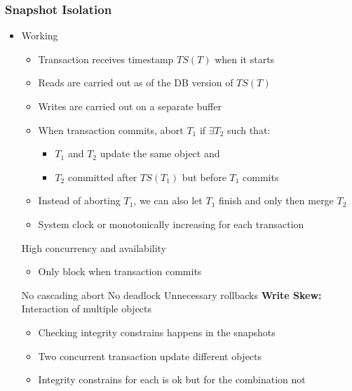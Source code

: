 \subsubsection{Snapshot Isolation}
\begin{itemize}
     Assume that transaction are serializable and revert if they are not
    \item Working
        \begin{itemize}
            \item Transaction receives timestamp $TS(T)$ when it starts
            \item Reads are carried out as of the DB version of $TS(T)$
            \item Writes are carried out on a separate buffer
            \item When transaction commits, abort $T_1$ if $\exists T_2$ such that:
                \begin{itemize}
                    \item $T_1$ and $T_2$ update the same object and
                    \item $T_2$ committed after $TS(T_1)$ but before $T_1$ commits
                \end{itemize}
            \item Instead of aborting $T_1$, we can also let $T_1$ finish and only then merge $T_2$
        \end{itemize}
        \begin{itemize}
            \item System clock or monotonically increasing for each transaction
        \end{itemize}
    \ipro High concurrency and availability
        \begin{itemize}
            \item Only block when transaction commits
        \end{itemize}
    \ipro No cascading abort
    \ipro No deadlock
    \icon Unnecessary rollbacks
    \icon \textbf{Write Skew:} Interaction of multiple objects
        \begin{itemize}
            \item Checking integrity constrains happens in the snapshots
            \item Two concurrent transaction update different objects
            \item Integrity constrains for each is ok but for the combination not
        \end{itemize}

\end{itemize}
